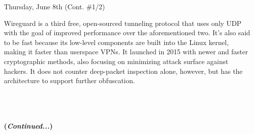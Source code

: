 \documentclass[11pt]{article}
\begin{document}
\begin{orangebox}{Thursday, June 8th (Cont. \#1/2)\vspace{-2em}\begin{flushright}\end{flushright}}
\begin{itemize}
    \phantom{~~~~} Wireguard is a third free, open-sourced tunneling protocol that uses only UDP with the goal of improved performance over the aforementioned two. It's also said to be fast because its low-level components are built into the Linux kernel, making it faster than userspace VPNs. It launched in 2015 with newer and faster cryptographic methods, also focusing on minimizing attack surface against hackers. It does not counter deep-packet inspection alone, however, but has the architecture to support further obfuscation.
\end{itemize}
    \begin{center}
    \vspace{-0.5em}
    \large\bullet \\
    \large\bullet \\
    \large\bullet \\
    \Large\textbf{(\textit{Continued...})}
    \end{center}
\end{orangebox}
\end{document}
